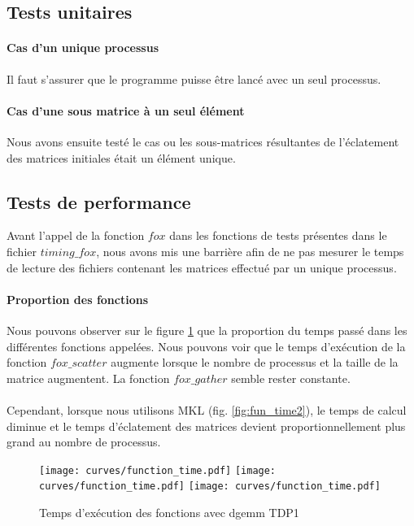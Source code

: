 \documentclass[12pt]{article}
\begin{document}
\subsection{Tests unitaires}
\paragraph{Cas d'un unique processus}
Il faut s'assurer que le programme puisse être lancé avec un seul processus.

\paragraph{Cas d'une sous matrice à un seul élément}
Nous avons ensuite testé le cas ou les sous-matrices résultantes de l'éclatement des matrices initiales était un élément unique.

\subsection{Tests de performance}
Avant l'appel de la fonction $fox$ dans les fonctions de tests présentes dans le fichier $timing\_fox$, nous avons mis une barrière afin de ne pas mesurer le temps de lecture des fichiers contenant les matrices effectué par un unique processus.

\paragraph{Proportion des fonctions}
Nous pouvons observer sur le figure \ref{fig:fun_time} que la proportion du temps passé dans les différentes fonctions appelées. Nous pouvons voir que le temps d'exécution de la fonction $fox\_scatter$ augmente lorsque le nombre de processus et la taille de la matrice augmentent. La fonction $fox\_gather$ semble rester constante.
\paragraph{}Cependant, lorsque nous utilisons MKL (fig. \ref{fig:fun_time2}), le temps de calcul diminue et le temps d'éclatement des matrices devient  proportionnellement plus grand au nombre de processus.

\begin{figure}[ht]
  \centering
  \texttt{[image: curves/function\_time.pdf]}
  \endminipage
  \texttt{[image: curves/function\_time.pdf]}
  \endminipage
  \texttt{[image: curves/function\_time.pdf]}
  \endminipage
  \caption{\label{fig:fun_time} Temps d'exécution des fonctions avec dgemm TDP1}
\end{figure}
\end{document}

